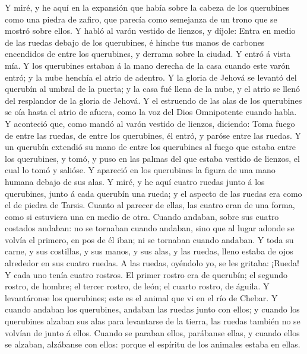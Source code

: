  Y miré, y he aquí en la expansión que había sobre la
cabeza de los querubines como una piedra de zafiro, que parecía como
semejanza de un trono que se mostró sobre ellos.  Y habló
al varón vestido de lienzos, y díjole: Entra en medio de las ruedas
debajo de los querubines, é hinche tus manos de carbones encendidos de
entre los querubines, y derrama sobre la ciudad. Y entró á vista mía.
 Y los querubines estaban á la mano derecha de la casa
cuando este varón entró; y la nube henchía el atrio de adentro.
 Y la gloria de Jehová se levantó del querubín al umbral
de la puerta; y la casa fué llena de la nube, y el atrio se llenó del
resplandor de la gloria de Jehová.  Y el estruendo de las
alas de los querubines se oía hasta el atrio de afuera, como la voz del
Dios Omnipotente cuando habla.  Y aconteció que, como
mandó al varón vestido de lienzos, diciendo: Toma fuego de entre las
ruedas, de entre los querubines, él entró, y paróse entre las ruedas.
 Y un querubín extendió su mano de entre los querubines al
fuego que estaba entre los querubines, y tomó, y puso en las palmas del
que estaba vestido de lienzos, el cual lo tomó y salióse. 
Y apareció en los querubines la figura de una mano humana debajo de sus
alas.  Y miré, y he aquí cuatro ruedas junto á los
querubines, junto á cada querubín una rueda; y el aspecto de las ruedas
era como el de piedra de Tarsis.  Cuanto al parecer de
ellas, las cuatro eran de una forma, como si estuviera una en medio de
otra.  Cuando andaban, sobre sus cuatro costados andaban:
no se tornaban cuando andaban, sino que al lugar adonde se volvía el
primero, en pos de él iban; ni se tornaban cuando andaban.
 Y toda su carne, y sus costillas, y sus manos, y sus
alas, y las ruedas, lleno estaba de ojos alrededor en sus cuatro ruedas.
 A las ruedas, oyéndolo yo, se les gritaba: ¡Rueda!
 Y cada uno tenía cuatro rostros. El primer rostro era de
querubín; el segundo rostro, de hombre; el tercer rostro, de león; el
cuarto rostro, de águila.  Y levantáronse los querubines;
este es el animal que vi en el río de Chebar.  Y cuando
andaban los querubines, andaban las ruedas junto con ellos; y cuando los
querubines alzaban sus alas para levantarse de la tierra, las ruedas
también no se volvían de junto á ellos.  Cuando se
paraban ellos, parábanse ellas, y cuando ellos se alzaban, alzábanse con
ellos: porque el espíritu de los animales estaba en ellas.
